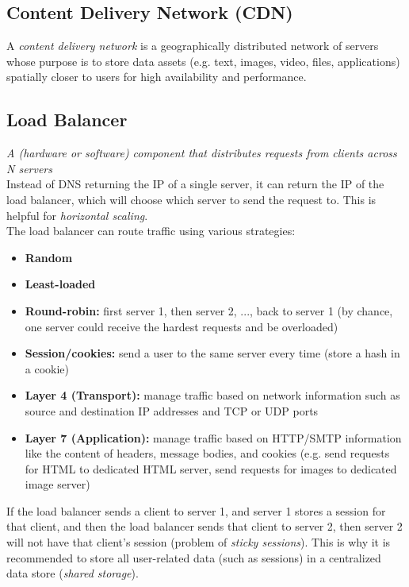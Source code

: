 \documentclass[12pt, titlepage]{article}
\begin{document}
\subsection{Content Delivery Network (CDN)}

A \textit{content delivery network} is a geographically distributed network of servers whose purpose is to store data assets (e.g. text, images, video, files, applications) spatially closer to users for high availability and performance.

\subsection{Load Balancer}

\textit{A (hardware or software) component that distributes requests from clients across N servers} \\

Instead of DNS returning the IP of a single server, it can return the IP of the load balancer, which will choose which server to send the request to. This is helpful for \textit{horizontal scaling}. \\

The load balancer can route traffic using various strategies:

\begin{itemize}
  \item \textbf{Random}
  \item \textbf{Least-loaded}
  \item \textbf{Round-robin:} first server 1, then server 2, ..., back to server 1 (by chance, one server could receive the hardest requests and be overloaded)
  \item \textbf{Session/cookies:} send a user to the same server every time (store a hash in a cookie)
  \item \textbf{Layer 4 (Transport):} manage traffic based on network information such as source and destination IP addresses and TCP or UDP ports
  \item \textbf{Layer 7 (Application):} manage traffic based on HTTP/SMTP information like the content of headers, message bodies, and cookies (e.g. send requests for HTML to dedicated HTML server, send requests for images to dedicated image server)
\end{itemize}

If the load balancer sends a client to server 1, and server 1 stores a session for that client, and then the load balancer sends that client to server 2, then server 2 will not have that client's session (problem of \textit{sticky sessions}). This is why it is recommended to store all user-related data (such as sessions) in a centralized data store (\textit{shared storage}). \\
\end{document}
